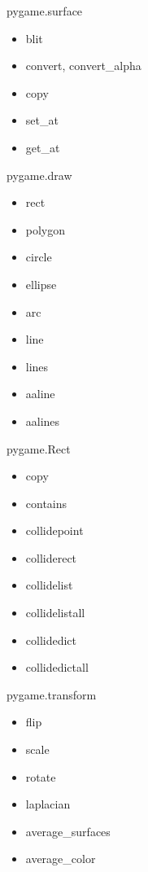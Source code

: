 \documentclass{beamer}
\begin{document}
\begin{frame}{pygame.surface}
  \begin{block}{}
    \begin{itemize}
    \item blit
    \item convert, convert\_alpha
    \item copy
    \item set\_at
    \item get\_at
    \end{itemize}
  \end{block}
\end{frame}

\begin{frame}{pygame.draw}
  \begin{block}{}
    \begin{itemize}
    \item rect
    \item polygon
    \item circle
    \item ellipse
    \item arc
    \item line
    \item lines
    \item aaline
    \item aalines
    \end{itemize}
  \end{block}
\end{frame}

\begin{frame}{pygame.Rect}
  \begin{block}{}
    \begin{itemize}
    \item copy
    \item contains
    \item collidepoint
    \item colliderect
    \item collidelist
    \item collidelistall
    \item collidedict
    \item collidedictall
    \end{itemize}
  \end{block}
\end{frame}

\begin{frame}{pygame.transform}
  \begin{block}{}
    \begin{itemize}
    \item flip
    \item scale
    \item rotate
    \item laplacian
    \item average\_surfaces
    \item average\_color
    \end{itemize}
  \end{block}
\end{frame}
\end{document}
